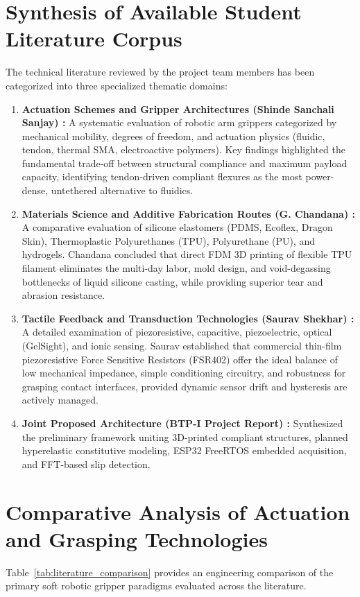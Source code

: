 \documentclass[12pt,a4paper]{report}
\begin{document}
\section{Synthesis of Available Student Literature Corpus}
The technical literature reviewed by the project team members has been categorized into three specialized thematic domains:
\begin{enumerate}
    \item \textbf{Actuation Schemes and Gripper Architectures (Shinde Sanchali Sanjay) \cite{btp_source_sanchali}:} A systematic evaluation of robotic arm grippers categorized by mechanical mobility, degrees of freedom, and actuation physics (fluidic, tendon, thermal SMA, electroactive polymers). Key findings highlighted the fundamental trade-off between structural compliance and maximum payload capacity, identifying tendon-driven compliant flexures as the most power-dense, untethered alternative to fluidics.
    \item \textbf{Materials Science and Additive Fabrication Routes (G. Chandana) \cite{btp_source_chandana}:} A comparative evaluation of silicone elastomers (PDMS, Ecoflex, Dragon Skin), Thermoplastic Polyurethanes (TPU), Polyurethane (PU), and hydrogels. Chandana concluded that direct FDM 3D printing of flexible TPU filament eliminates the multi-day labor, mold design, and void-degassing bottlenecks of liquid silicone casting, while providing superior tear and abrasion resistance.
    \item \textbf{Tactile Feedback and Transduction Technologies (Saurav Shekhar) \cite{btp_source_saurav}:} A detailed examination of piezoresistive, capacitive, piezoelectric, optical (GelSight), and ionic sensing. Saurav established that commercial thin-film piezoresistive Force Sensitive Resistors (FSR402) offer the ideal balance of low mechanical impedance, simple conditioning circuitry, and robustness for grasping contact interfaces, provided dynamic sensor drift and hysteresis are actively managed.
    \item \textbf{Joint Proposed Architecture (BTP-I Project Report) \cite{btp_source_joint}:} Synthesized the preliminary framework uniting 3D-printed compliant structures, planned hyperelastic constitutive modeling, ESP32 FreeRTOS embedded acquisition, and FFT-based slip detection.
\end{enumerate}

\section{Comparative Analysis of Actuation and Grasping Technologies}
Table~\ref{tab:literature_comparison} provides an engineering comparison of the primary soft robotic gripper paradigms evaluated across the literature.
\end{document}
